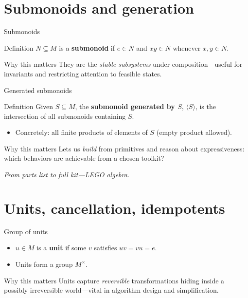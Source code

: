 \documentclass[aspectratio=169,11pt]{beamer}
\newcommand{\tline}[1]{\par\medskip\textcolor{transit}{\emph{#1}}\par\medskip}
\begin{document}
\section{Submonoids and generation}
\begin{frame}{Submonoids}
\begin{block}{Definition}
$N\subseteq M$ is a \textbf{submonoid} if $e\in N$ and $xy\in N$ whenever $x,y\in N$.
\end{block}
\begin{alertblock}{Why this matters}
They are the \emph{stable subsystems} under composition—useful for invariants and restricting attention to feasible states.
\end{alertblock}
\end{frame}

\begin{frame}{Generated submonoids}
\begin{block}{Definition}
Given $S\subseteq M$, the \textbf{submonoid generated by $S$}, $\langle S\rangle$, is the intersection of all submonoids containing $S$.
\end{block}
\begin{itemize}
  \item Concretely: all finite products of elements of $S$ (empty product allowed).
\end{itemize}
\begin{alertblock}{Why this matters}
Lets us \emph{build} from primitives and reason about expressiveness: which behaviors are achievable from a chosen toolkit?
\end{alertblock}
\tline{From parts list to full kit—LEGO algebra.}
\end{frame}

\section{Units, cancellation, idempotents}
\begin{frame}{Group of units}
\begin{itemize}
  \item $u\in M$ is a \textbf{unit} if some $v$ satisfies $uv=vu=e$.
  \item Units form a group $M^\times$.
\end{itemize}
\begin{alertblock}{Why this matters}
Units capture \emph{reversible} transformations hiding inside a possibly irreversible world—vital in algorithm design and simplification.
\end{alertblock}
\end{frame}
\end{document}
